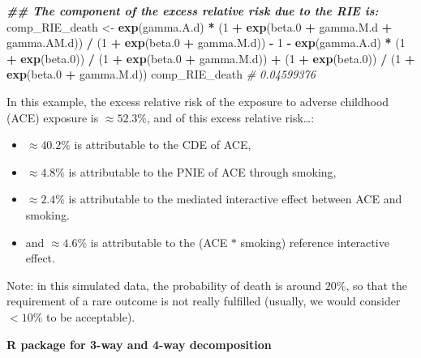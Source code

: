 \documentclass[
]{book}
\newenvironment{Shaded}{\begin{snugshade}}{\end{snugshade}}
\newcommand{\CommentTok}[1]{\textcolor[rgb]{0.56,0.35,0.01}{\textit{#1}}}
\newcommand{\DecValTok}[1]{\textcolor[rgb]{0.00,0.00,0.81}{#1}}
\newcommand{\DocumentationTok}[1]{\textcolor[rgb]{0.56,0.35,0.01}{\textbf{\textit{#1}}}}
\newcommand{\FloatTok}[1]{\textcolor[rgb]{0.00,0.00,0.81}{#1}}
\newcommand{\FunctionTok}[1]{\textcolor[rgb]{0.13,0.29,0.53}{\textbf{#1}}}
\newcommand{\NormalTok}[1]{#1}
\newcommand{\OtherTok}[1]{\textcolor[rgb]{0.56,0.35,0.01}{#1}}
\newcommand{\SpecialCharTok}[1]{\textcolor[rgb]{0.81,0.36,0.00}{\textbf{#1}}}
\providecommand{\tightlist}{%
  \setlength{\itemsep}{0pt}\setlength{\parskip}{0pt}}
\begin{document}
\begin{Shaded}
\begin{Highlighting}[]
\DocumentationTok{\#\# The component of the excess relative risk due to the RIE is:}
\NormalTok{comp\_RIE\_death }\OtherTok{\textless{}{-}} \FunctionTok{exp}\NormalTok{(gamma.A.d) }\SpecialCharTok{*}\NormalTok{ (}\DecValTok{1} \SpecialCharTok{+} \FunctionTok{exp}\NormalTok{(beta}\FloatTok{.0} \SpecialCharTok{+}\NormalTok{ gamma.M.d }\SpecialCharTok{+}\NormalTok{ gamma.AM.d)) }\SpecialCharTok{/}
\NormalTok{  (}\DecValTok{1} \SpecialCharTok{+} \FunctionTok{exp}\NormalTok{(beta}\FloatTok{.0} \SpecialCharTok{+}\NormalTok{ gamma.M.d)) }\SpecialCharTok{{-}} \DecValTok{1} \SpecialCharTok{{-}}
  \FunctionTok{exp}\NormalTok{(gamma.A.d) }\SpecialCharTok{*}\NormalTok{ (}\DecValTok{1} \SpecialCharTok{+} \FunctionTok{exp}\NormalTok{(beta}\FloatTok{.0}\NormalTok{)) }\SpecialCharTok{/}\NormalTok{ (}\DecValTok{1} \SpecialCharTok{+} \FunctionTok{exp}\NormalTok{(beta}\FloatTok{.0} \SpecialCharTok{+}\NormalTok{ gamma.M.d)) }\SpecialCharTok{+}
\NormalTok{  (}\DecValTok{1} \SpecialCharTok{+} \FunctionTok{exp}\NormalTok{(beta}\FloatTok{.0}\NormalTok{)) }\SpecialCharTok{/}\NormalTok{ (}\DecValTok{1} \SpecialCharTok{+} \FunctionTok{exp}\NormalTok{(beta}\FloatTok{.0} \SpecialCharTok{+}\NormalTok{ gamma.M.d))}
\NormalTok{comp\_RIE\_death}
\CommentTok{\# 0.04599376}
\end{Highlighting}
\end{Shaded}

In this example, the excess relative risk of the exposure to adverse childhood (ACE) exposure is \(\approx 52.3\%\), and of this excess relative risk\ldots:

\begin{itemize}
\tightlist
\item
  \(\approx 40.2\%\) is attributable to the CDE of ACE,
\item
  \(\approx 4.8\%\) is attributable to the PNIE of ACE through smoking,
\item
  \(\approx 2.4\%\) is attributable to the mediated interactive effect between ACE and smoking.
\item
  and \(\approx 4.6\%\) is attributable to the (ACE \(\ast\) smoking) reference interactive effect.
\end{itemize}

Note: in this simulated data, the probability of death is around \(20\%\), so that the requirement of a rare outcome is not really fulfilled (usually, we would consider \(< 10\%\) to be acceptable).

\textbf{R package for 3-way and 4-way decomposition}
\end{document}
